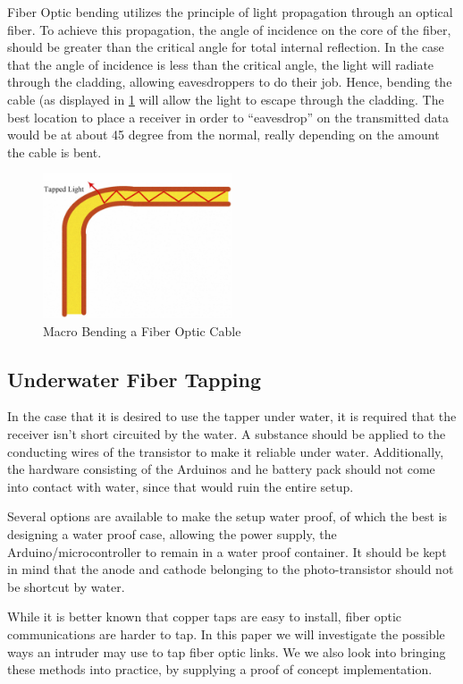 \documentclass[11pt,twoside,a4paper]{scrartcl}
\begin{document}
		Fiber Optic bending utilizes the principle of light propagation through an optical fiber.
		To achieve this propagation, the angle of incidence on the core of the fiber,
		should be greater than the critical angle for total internal reflection.
		In the case that the angle of incidence is less than the critical angle, the light will radiate through the cladding,
		allowing eavesdroppers to do their job. Hence, bending the cable (as displayed in \cref{fig:bending} will allow the light to escape through the cladding.
		The best location to place a receiver in order to ``eavesdrop'' on the transmitted data would be at about 45 degree from the normal,
		really depending on the amount the cable is bent. 
		\begin{figure}[htbp]
			\centering
			\includegraphics[width=0.5\textwidth]{bending}
			\caption{Macro Bending a Fiber Optic Cable}
			\label{fig:bending}
		\end{figure}

	\subsection{Underwater Fiber Tapping}
		In the case that it is desired to use the tapper under water, it is required that the receiver isn't short circuited by the water.
		A substance should be applied to the conducting wires of the transistor to make it reliable under water.
		Additionally, the hardware consisting of the Arduinos and he battery pack should not come into contact with water,
		since that would ruin the entire setup. 

		Several options are available to make the setup water proof, of which the best is designing a water proof case, allowing the power supply,
		the Arduino/microcontroller to remain in a water proof container.
		It should be kept in mind that the anode and cathode belonging to the photo-transistor should not be shortcut by water.

		While it is better known that copper taps are easy to install, fiber optic communications are harder to tap.
		In this paper we will investigate the possible ways an intruder may use to tap fiber optic links.
		We we also look into bringing these methods into practice, by supplying a proof of concept implementation.
\end{document}
